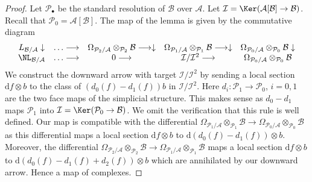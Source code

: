 \begin{proof}

Let $\mathcal{P}_\bullet$ be the standard resolution of $\mathcal{B}$
over $\mathcal{A}$.
Let $\mathcal{I} = \Ker(\mathcal{A}[\mathcal{B}] \to \mathcal{B})$.
Recall that $\mathcal{P}_0 = \mathcal{A}[\mathcal{B}]$. The map of the
lemma is given by the commutative diagram
$$
\begin{array}{ccccc}L_{\mathcal{B}/\mathcal{A}} \downarrow & \ldots \longrightarrow & \Omega_{\mathcal{P}_2/\mathcal{A}} \otimes_{\mathcal{P}_2} \mathcal{B}
\longrightarrow\downarrow & \Omega_{\mathcal{P}_1/\mathcal{A}} \otimes_{\mathcal{P}_1} \mathcal{B}
\longrightarrow\downarrow & \Omega_{\mathcal{P}_0/\mathcal{A}} \otimes_{\mathcal{P}_0} \mathcal{B}
\downarrow \\ \NL_{\mathcal{B}/\mathcal{A}} & \ldots \longrightarrow & 0 \longrightarrow & \mathcal{I}/\mathcal{I}^2 \longrightarrow & \Omega_{\mathcal{P}_0/\mathcal{A}} \otimes_{\mathcal{P}_0} \mathcal{B}\end{array}
$$
We construct the downward arrow with target $\mathcal{I}/\mathcal{I}^2$
by sending a local section $\text{d}f \otimes b$ to the class of
$(d_0(f) - d_1(f))b$ in $\mathcal{I}/\mathcal{I}^2$.
Here $d_i : \mathcal{P}_1 \to \mathcal{P}_0$,
$i = 0, 1$ are the two face maps of the simplicial structure.
This makes sense as $d_0 - d_1$ maps $\mathcal{P}_1$ into
$\mathcal{I} = \Ker(\mathcal{P}_0 \to \mathcal{B})$.
We omit the verification that this rule is well defined.
Our map is compatible with the differential
$\Omega_{\mathcal{P}_1/\mathcal{A}} \otimes_{\mathcal{P}_1} \mathcal{B}
\to \Omega_{\mathcal{P}_0/\mathcal{A}} \otimes_{\mathcal{P}_0} \mathcal{B}$
as this differential maps a local section $\text{d}f \otimes b$ to
$\text{d}(d_0(f) - d_1(f)) \otimes b$. Moreover, the differential
$\Omega_{\mathcal{P}_2/\mathcal{A}} \otimes_{\mathcal{P}_2} \mathcal{B}
\to \Omega_{\mathcal{P}_1/\mathcal{A}} \otimes_{\mathcal{P}_1} \mathcal{B}$
maps a local section $\text{d}f \otimes b$ to
$\text{d}(d_0(f) - d_1(f) + d_2(f)) \otimes b$
which are annihilated by our downward arrow. Hence a map of complexes.


\end{proof}
